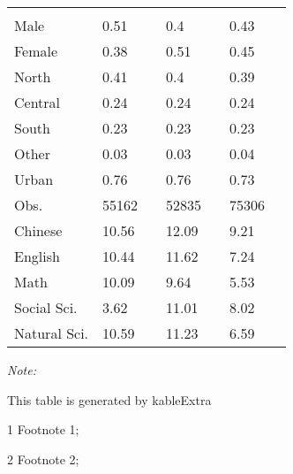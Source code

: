 \begin{table}
\begin{threeparttable}
\begin{tabular}[t]{lllllll}
\addlinespace[0.3em]
\multicolumn{7}{l}{\textit{\textbf{Panel D: Demographic}}}\\
\hspace{1em}Male & 0.51 &  & 0.4 &  & 0.43 & \\
\hspace{1em}Female & 0.38 &  & 0.51 &  & 0.45 & \\
\hspace{1em}North & 0.41 &  & 0.4 &  & 0.39 & \\
\hspace{1em}Central & 0.24 &  & 0.24 &  & 0.24 & \\
\hspace{1em}South & 0.23 &  & 0.23 &  & 0.23 & \\
\hspace{1em}Other & 0.03 &  & 0.03 &  & 0.04 & \\
\hspace{1em}Urban & 0.76 &  & 0.76 &  & 0.73 & \\
Obs. & 55162 &  & 52835 &  & 75306 & \\
Chinese & 10.56 &  & 12.09 &  & 9.21 & \\
English & 10.44 &  & 11.62 &  & 7.24 & \\
Math & 10.09 &  & 9.64 &  & 5.53 & \\
Social Sci. & 3.62 &  & 11.01 &  & 8.02 & \\
Natural Sci. & 10.59 &  & 11.23 &  & 6.59 & \\
\bottomrule
\end{tabular}
\begin{tablenotes}
\item \textit{Note: } 
\item This table is generated by kableExtra
\item[1] Footnote 1; 
\item[2] Footnote 2; 
\end{tablenotes}
\end{threeparttable}
\end{table}
